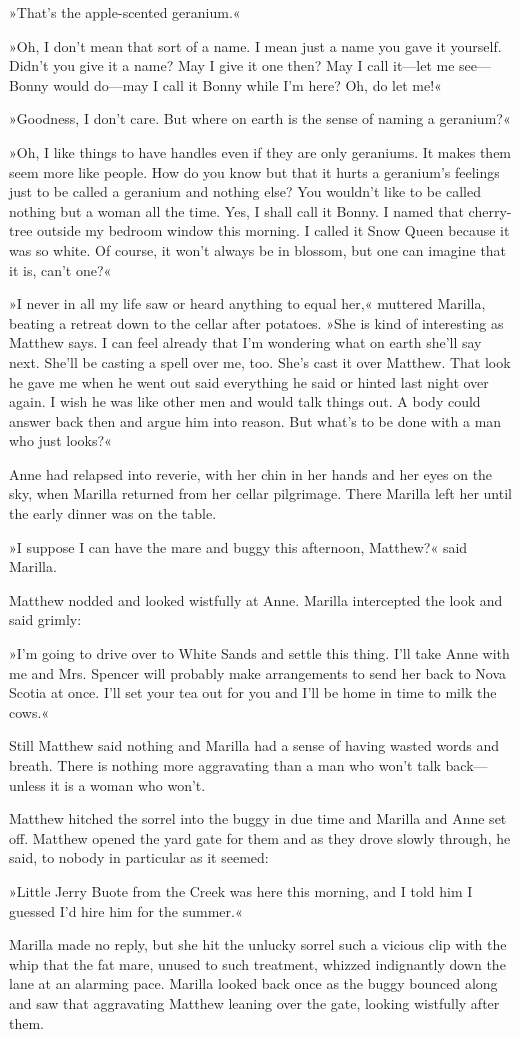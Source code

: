 »That’s the apple-scented geranium.«

»Oh, I don’t mean that sort of a name. I mean just a name you gave it yourself. Didn’t you give it a name? May I give it one then? May I call it—let me see—Bonny would do—may I call it Bonny while I’m here? Oh, do let me!«

»Goodness, I don’t care. But where on earth is the sense of naming a geranium?«

»Oh, I like things to have handles even if they are only geraniums. It makes them seem more like people. How do you know but that it hurts a geranium’s feelings just to be called a geranium and nothing else? You wouldn’t like to be called nothing but a woman all the time. Yes, I shall call it Bonny. I named that cherry-tree outside my bedroom window this morning. I called it Snow Queen because it was so white. Of course, it won’t always be in blossom, but one can imagine that it is, can’t one?«

»I never in all my life saw or heard anything to equal her,« muttered Marilla, beating a retreat down to the cellar after potatoes. »She is kind of interesting as Matthew says. I can feel already that I’m wondering what on earth she’ll say next. She’ll be casting a spell over me, too. She’s cast it over Matthew. That look he gave me when he went out said everything he said or hinted last night over again. I wish he was like other men and would talk things out. A body could answer back then and argue him into reason. But what’s to be done with a man who just looks?«

Anne had relapsed into reverie, with her chin in her hands and her eyes on the sky, when Marilla returned from her cellar pilgrimage. There Marilla left her until the early dinner was on the table.

»I suppose I can have the mare and buggy this afternoon, Matthew?« said Marilla.

Matthew nodded and looked wistfully at Anne. Marilla intercepted the look and said grimly:

»I’m going to drive over to White Sands and settle this thing. I’ll take Anne with me and Mrs. Spencer will probably make arrangements to send her back to Nova Scotia at once. I’ll set your tea out for you and I’ll be home in time to milk the cows.«

Still Matthew said nothing and Marilla had a sense of having wasted words and breath. There is nothing more aggravating than a man who won’t talk back—unless it is a woman who won’t.

Matthew hitched the sorrel into the buggy in due time and Marilla and Anne set off. Matthew opened the yard gate for them and as they drove slowly through, he said, to nobody in particular as it seemed:

»Little Jerry Buote from the Creek was here this morning, and I told him I guessed I’d hire him for the summer.«

Marilla made no reply, but she hit the unlucky sorrel such a vicious clip with the whip that the fat mare, unused to such treatment, whizzed indignantly down the lane at an alarming pace. Marilla looked back once as the buggy bounced along and saw that aggravating Matthew leaning over the gate, looking wistfully after them.

